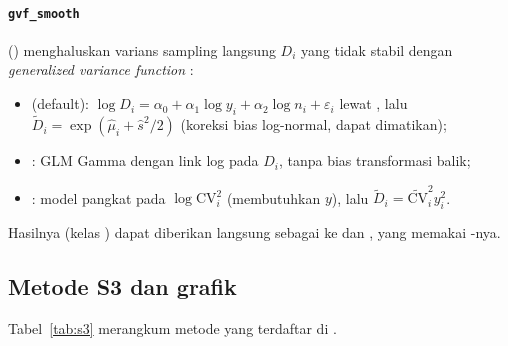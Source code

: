 \paragraph{\texttt{gvf\_smooth}} () menghaluskan varians
sampling langsung $D_i$ yang tidak stabil dengan \emph{generalized variance
function} \citep{wolter2007introduction}:
\begin{itemize}
  \item {} (default):
        $\log D_i=\alpha_0+\alpha_1\log y_i+\alpha_2\log n_i+\varepsilon_i$
        lewat , lalu $\tilde D_i=\exp(\hat\mu_i+\hat s^2/2)$ (koreksi
        bias log-normal, dapat dimatikan);
  \item {}: GLM Gamma dengan link log pada $D_i$, tanpa bias
        transformasi balik;
  \item {}: model pangkat pada $\log\mathrm{CV}_i^2$
        (membutuhkan $y$), lalu $\tilde D_i=\widetilde{\mathrm{CV}}_i^2y_i^2$.
\end{itemize}
Hasilnya (kelas ) dapat diberikan langsung sebagai
 ke  dan , yang memakai
-nya.

\subsection{Metode S3 dan grafik}\label{sec:s3}

Tabel~\ref{tab:s3} merangkum metode yang terdaftar di .

